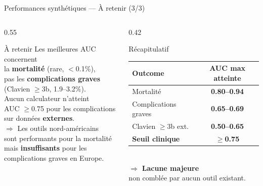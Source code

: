 \documentclass[aspectratio=169]{beamer}
\begin{document}
\begin{frame}{Performances synthétiques --- À retenir (3/3)}
  \begin{columns}[T]
    \begin{column}{0.55\textwidth}
      \begin{alertblock}{À retenir}
        \footnotesize
        Les meilleures AUC concernent\\
        la \textbf{mortalité} (rare, $<$0.1\%),\\
        pas les \textbf{complications graves}\\
        (Clavien $\geq$3b, 1.9--3.2\%).\\[6pt]
        Aucun calculateur n'atteint\\
        AUC $\geq$0.75 pour les complications\\
        sur données \textbf{externes}.\\[6pt]
        $\Rightarrow$ Les outils nord-américains\\
        sont performants pour la mortalité\\
        mais \textbf{insuffisants} pour les\\
        complications graves en Europe.
      \end{alertblock}
    \end{column}
    \begin{column}{0.42\textwidth}
      \begin{block}{Récapitulatif}
        \footnotesize
        \begin{tabular}{lc}
          \toprule
          \textbf{Outcome} & \textbf{AUC max atteinte} \\
          \midrule
          Mortalité & \textcolor{vertdoux}{\textbf{0.80--0.94}} \\
          Complications graves & \textcolor{orangemod}{\textbf{0.65--0.69}} \\
          Clavien $\geq$3b ext. & \textcolor{rougealerte}{\textbf{0.50--0.65}} \\
          \midrule
          \textbf{Seuil clinique} & \textbf{$\geq$0.75} \\
          \bottomrule
        \end{tabular}
        \vspace{6pt}\\
        $\Rightarrow$ \textcolor{rougealerte}{\textbf{Lacune majeure}}\\
        non comblée par aucun outil existant.
      \end{block}
    \end{column}
  \end{columns}
\end{frame}
\end{document}
